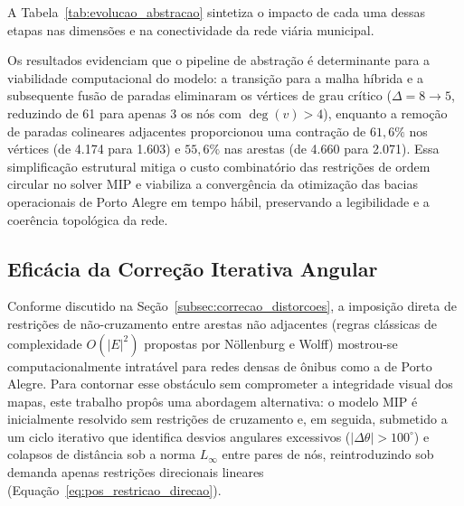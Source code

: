 \documentclass[cic,tc]{infufrgs}
\begin{document}
A Tabela~\ref{tab:evolucao_abstracao} sintetiza o impacto de cada uma dessas etapas nas dimensões e na conectividade da rede viária municipal.

\begin{table}[H]
    \centering
    \caption{Evolução da dimensão e da complexidade topológica do grafo de Porto Alegre ao longo das etapas de abstração de dados.}
    \label{tab:evolucao_abstracao}
\end{table}

Os resultados evidenciam que o pipeline de abstração é determinante para a viabilidade computacional do modelo: a transição para a malha híbrida e a subsequente fusão de paradas eliminaram os vértices de grau crítico ($\Delta = 8 \to 5$, reduzindo de 61 para apenas 3 os nós com $\deg(v) > 4$), enquanto a remoção de paradas colineares adjacentes proporcionou uma contração de $61{,}6\%$ nos vértices (de 4.174 para 1.603) e $55{,}6\%$ nas arestas (de 4.660 para 2.071). Essa simplificação estrutural mitiga o custo combinatório das restrições de ordem circular no solver MIP e viabiliza a convergência da otimização das bacias operacionais de Porto Alegre em tempo hábil, preservando a legibilidade e a coerência topológica da rede.

\subsection{Eficácia da Correção Iterativa Angular}
\label{subsec:analise_correcao_iterativa}

Conforme discutido na Seção~\ref{subsec:correcao_distorcoes}, a imposição direta de restrições de não-cruzamento entre arestas não adjacentes (regras clássicas de complexidade $O(|E|^2)$ propostas por Nöllenburg e Wolff) mostrou-se computacionalmente intratável para redes densas de ônibus como a de Porto Alegre. Para contornar esse obstáculo sem comprometer a integridade visual dos mapas, este trabalho propôs uma abordagem alternativa: o modelo MIP é inicialmente resolvido sem restrições de cruzamento e, em seguida, submetido a um ciclo iterativo que identifica desvios angulares excessivos ($|\Delta\theta| > 100^\circ$) e colapsos de distância sob a norma $L_\infty$ entre pares de nós, reintroduzindo sob demanda apenas restrições direcionais lineares (Equação~\ref{eq:pos_restricao_direcao}).
\end{document}
